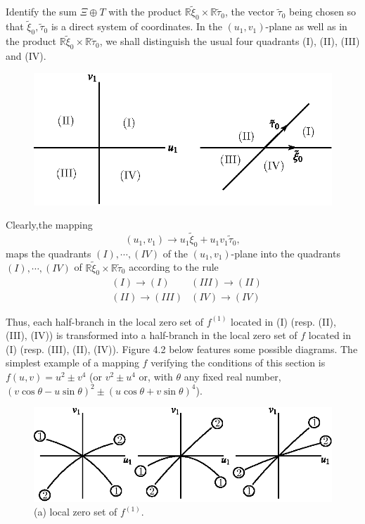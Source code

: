 Identify the sum $\Xi \oplus T$ with the product
$\mathbb{R}\widetilde{\xi}_{0} \times \mathbb{R}
\widetilde{\tau}_{0}$, the vector $\widetilde{\tau}_{0}$ being chosen
so that ${\widetilde{\xi}_{0}, \widetilde{\tau}_{0}}$ is a direct
system of coordinates. In the $(u_{1}, v_{1})$-plane as well as in the
product $\mathbb{R} \widetilde{\xi}_{0} \times \mathbb{R}
\widetilde{\tau}_{0}$, we shall distinguish the usual four quadrants
(I), (II), (III) and (IV).
\begin{figure}[H]
\centering
\includegraphics{figure/fig76-4.1_1.eps}
\end{figure}


Clearly,\pageoriginale the mapping
$$
(u_{1}, v_{1}) \to u_{1}\widetilde{\xi}_{0} + u_{1}v_{1}\widetilde{\tau}_{0},
$$
maps the quadrants $(I), \cdots , (IV)$ of the $(u_{1}, v_{1})$-plane
into the quadrants $(I), \cdots , (IV)$ of $\mathbb{R}
\widetilde{\xi}_{0} \times \mathbb{R} \widetilde{\tau}_{0}$ according
to the rule
\begin{align*}
& (I) \to (I) & (III) \to (II)\\
& (II) \to (III) & (IV) \to (IV)
\end{align*}

Thus, each half-branch in the local zero set of $f^{(1)}$ located in
(I) (resp. (II), (III), (IV)) is transformed into a half-branch in the
local zero set of $f$ located in (I) (resp. (III), (II), (IV)). Figure
4.2 below features some possible diagrams. The simplest example of a
mapping $f$ verifying the conditions of this section is $f(u, v) = u^{2}
\pm v^{4}$ (or $v^{2} \pm u^{4}$ or, with $\theta$ any fixed real
number, $(v \cos \theta - u \sin \theta)^{2} \pm (u \cos \theta + v
\sin \theta)^{4}$).
\begin{figure}[H]
\centering
\includegraphics{figure/fig76-4.2a.eps}
\caption{(a) local zero set of $f^{(1)}$.}
\end{figure}

